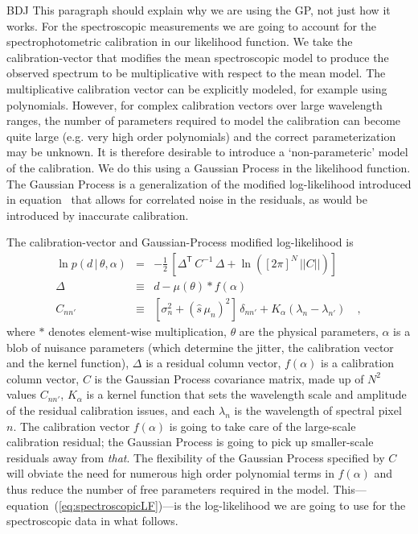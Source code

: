 \documentclass[iop,numberedappendix]{emulateapj}
\newcommand{\transpose}[1]{{#1}^{\!\mathsf T}}
\newcommand{\given}{\,|\,}
\renewcommand{\det}[1]{||{#1}||}
\begin{document}
{\color{blue} BDJ This paragraph should explain why we are using the
GP, not just how it works.}
For the spectroscopic measurements we are going to account for the
spectrophotometric calibration in our likelihood function.  We take
the calibration-vector that modifies the mean spectroscopic model to
produce the observed spectrum to be multiplicative with respect to the
mean model.  The multiplicative calibration vector can be explicitly
modeled, for example using polynomials.  However, for complex
calibration vectors over large wavelength ranges, the number of
parameters required to model the calibration can become quite large
(e.g. very high order polynomials) and the correct parameterization
may be unknown.  It is therefore desirable to introduce a
`non-parameteric' model of the calibration.  We do this using a
Gaussian Process in the likelihood function.  The Gaussian Process is
a generalization of the modified log-likelihood introduced in
equation~\label{eq:photometricLF} that allows for correlated noise in
the residuals, as would be introduced by inaccurate calibration.


The calibration-vector and Gaussian-Process modified log-likelihood is
\begin{eqnarray}\label{eq:spectroscopicLF_v2}
\ln p(d\given\theta,\alpha) &=&
                                -\frac{1}{2}\,\left[\transpose{\Delta}\,C^{-1}\,\Delta
                                + \ln([2\pi]^N\,\det{C}) \right]
\\
\Delta &\equiv& d - \mu(\theta) \ast f(\alpha) 
\\
C_{nn'} &\equiv& [\sigma_n^2 + (\hat{s} \, \mu_n)^2]\,\delta_{nn'} +
 K_\alpha(\lambda_n - \lambda_{n'}) 
\quad ,
\end{eqnarray}
where $\ast$ denotes element-wise multiplication,
$\theta$ are the physical parameters,
$\alpha$ is a blob of nuisance parameters
(which determine the jitter, the calibration vector and the kernel function),
$\Delta$ is a residual column vector,
$f(\alpha)$ is a calibration column vector,
$C$ is the Gaussian Process covariance matrix,
made up of $N^2$ values $C_{nn'}$,
$K_\alpha$ is a kernel function that sets the wavelength scale and
amplitude of the residual calibration issues,
and each $\lambda_n$ is the wavelength of spectral pixel $n$.
The calibration vector $f(\alpha)$ is going to take care of the
large-scale calibration residual; the Gaussian Process is going to
pick up smaller-scale residuals away from \emph{that}.  The
flexibility of the Gaussian Process specified by $C$ will obviate the
need for numerous high order polynomial terms in $f(\alpha)$ and thus
reduce the number of free parameters required in the model.
This---equation~(\ref{eq:spectroscopicLF})---is the log-likelihood we
are going to use for the spectroscopic data in what follows.
\end{document}
